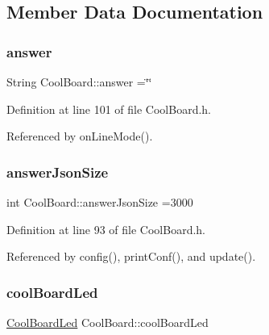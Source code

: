\subsection{Member Data Documentation}
\mbox{\label{classCoolBoard_a7b835fafd449e5282f7f91d787a2dc15}} 
\subsubsection{\texorpdfstring{answer}{answer}}
{\footnotesize\ttfamily String Cool\+Board\+::answer =\char`\"{}\char`\"{}\hspace{0.3cm}{\ttfamily [private]}}



Definition at line 101 of file Cool\+Board.\+h.



Referenced by on\+Line\+Mode().

\mbox{\label{classCoolBoard_af2da1f85315b3d074a8b87d158094fb7}} 
\subsubsection{\texorpdfstring{answer\+Json\+Size}{answerJsonSize}}
{\footnotesize\ttfamily int Cool\+Board\+::answer\+Json\+Size =3000\hspace{0.3cm}{\ttfamily [private]}}



Definition at line 93 of file Cool\+Board.\+h.



Referenced by config(), print\+Conf(), and update().

\mbox{\label{classCoolBoard_a1b1d3c684a5baa56b08486e192fd8e97}} 
\subsubsection{\texorpdfstring{cool\+Board\+Led}{coolBoardLed}}
{\footnotesize\ttfamily \hyperlink{classCoolBoardLed}{Cool\+Board\+Led} Cool\+Board\+::cool\+Board\+Led\hspace{0.3cm}{\ttfamily [private]}}



